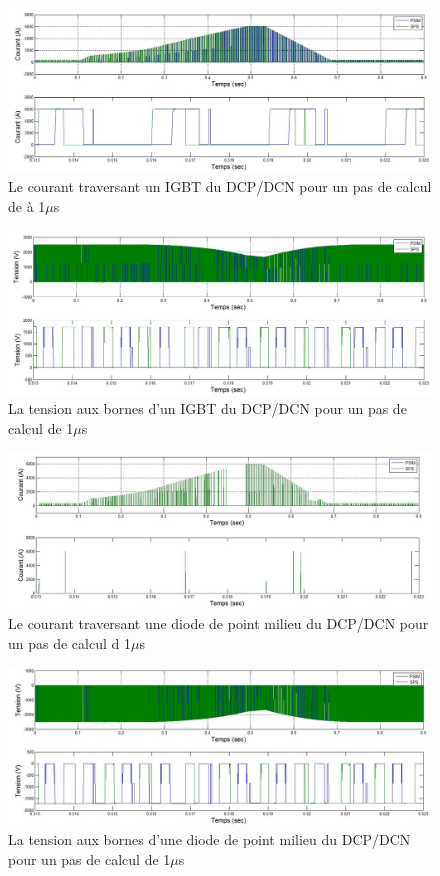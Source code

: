 \begin{figure}[htb]
\centering
\includegraphics[scale=0.5]{fig/DCP_AFE/1u/hash_cou_IGBT.jpg}
\caption{Le courant traversant un IGBT du DCP/DCN pour un pas de calcul de à 1$\mu$s}
\label{AF_DC_HAA1}
\end{figure}



\begin{figure}[htb]
\centering
\includegraphics[scale=0.5]{fig/DCP_AFE/1u/hash_ten_IGBT.jpg}
\caption{La tension aux bornes d'un IGBT du DCP/DCN pour un pas de calcul de 1$\mu$s}
\label{AF_DC_HAV1}
\end{figure}



\begin{figure}[htb]
\centering
\includegraphics[scale=0.5]{fig/DCP_AFE/1u/hash_diode_cou.jpg}
\caption{Le courant traversant une diode de point milieu du DCP/DCN pour un pas de calcul d 1$\mu$s}
\label{AF_DC_HA1}
\end{figure}


\begin{figure}[htb]
\centering
\includegraphics[scale=0.5]{fig/DCP_AFE/1u/hash_diode.jpg}
\caption{La tension aux bornes d'une diode de point milieu du DCP/DCN pour un pas de calcul de 1$\mu$s}
\label{AF_DC_HV1}
\end{figure}
